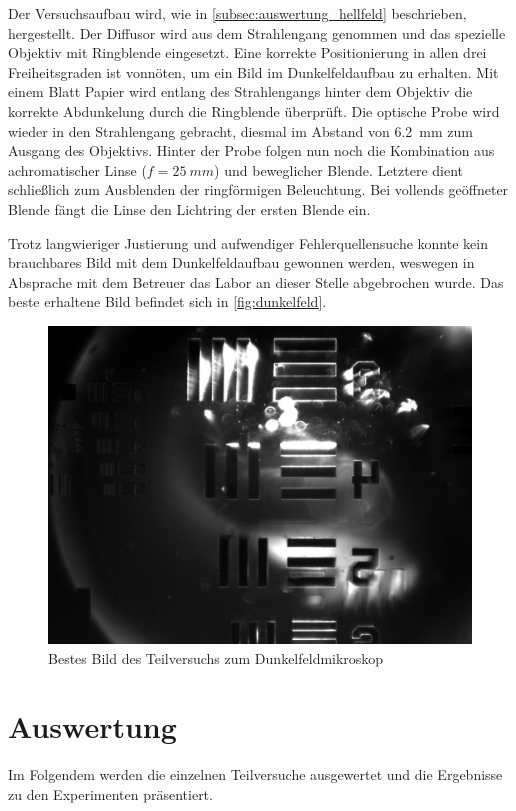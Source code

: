 \documentclass[ngerman]{scrartcl}
\begin{document}
Der Versuchsaufbau wird, wie in \autoref{subsec:auswertung_hellfeld} beschrieben, hergestellt. Der Diffusor wird aus dem Strahlengang genommen und das spezielle Objektiv mit Ringblende eingesetzt. Eine korrekte Positionierung in allen drei Freiheitsgraden ist vonnöten, um ein Bild im Dunkelfeldaufbau zu erhalten. Mit einem Blatt Papier wird entlang des Strahlengangs hinter dem Objektiv die korrekte Abdunkelung durch die Ringblende überprüft. Die optische Probe wird wieder in den Strahlengang gebracht, diesmal im Abstand von \SI{6.2}{mm} zum Ausgang des Objektivs. Hinter der Probe folgen nun noch die Kombination aus achromatischer Linse
($f = \SI{25}{mm}$) und beweglicher Blende. Letztere dient schließlich zum Ausblenden der ringförmigen Beleuchtung. Bei vollends geöffneter Blende fängt die Linse den Lichtring der ersten Blende ein.

Trotz langwieriger Justierung und aufwendiger Fehlerquellensuche konnte kein brauchbares Bild mit dem Dunkelfeldaufbau gewonnen werden, weswegen in Absprache mit dem Betreuer das Labor an dieser Stelle abgebrochen wurde. Das beste erhaltene Bild befindet sich in \autoref{fig:dunkelfeld}.
%
\begin{figure}[H]
    \centering
    \begin{samepage}
        \includegraphics[width=0.6\linewidth]{fig/Versuch4/dunkelfeld_test.jpg}
        \caption[Dunkelfeld]{Bestes Bild des Teilversuchs zum Dunkelfeldmikroskop}
        \label{fig:dunkelfeld}
    \end{samepage}
\end{figure}



\section{Auswertung}
\label{sec:auswertung}

Im Folgendem werden die einzelnen Teilversuche ausgewertet und die Ergebnisse zu den Experimenten präsentiert.
\end{document}
